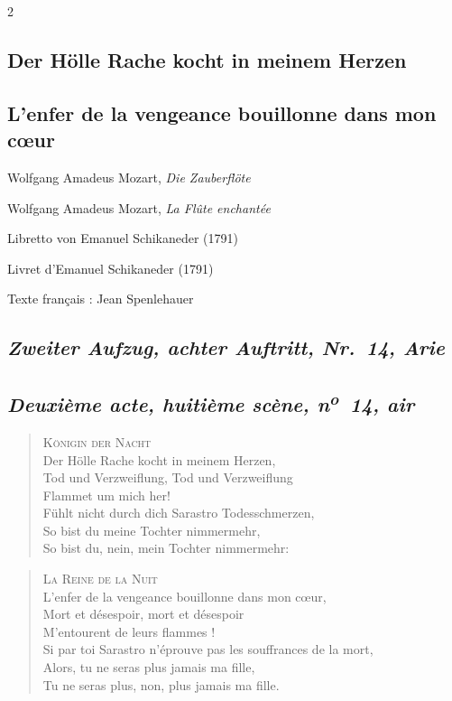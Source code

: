 \documentclass[a4paper,12pt]{article}
\newcommand\chunks[2]{%
\begin{leftcolumn*}\begin{otherlanguage}{german}%
{#1}%
\end{otherlanguage}\end{leftcolumn*}%
\begin{rightcolumn}\begin{otherlanguage}{french}%
{#2}%
\end{otherlanguage}\end{rightcolumn}%
}
\newcommand\strophe[1]{\subsection*{\normalsize\normalfont\itshape #1}}
\begin{document}
\thispagestyle{empty}
\setlength{\columnsep}{8mm}


\begin{paracol}{2}

  \chunks{\section*{Der Hölle Rache kocht in meinem Herzen}}
         {\section*{L’enfer de la vengeance bouillonne dans mon cœur}}

  \chunks{\noindent\raggedright\small Wolfgang Amadeus Mozart, \textit{Die Zauberflöte}}
         {\noindent\raggedright\small Wolfgang Amadeus Mozart, \textit{La Flûte enchantée}}

  \chunks{\noindent\raggedright\small Libretto von Emanuel Schikaneder (1791)}
         {\noindent\raggedright\small Livret d’Emanuel Schikaneder (1791)}

  \chunks{}
         {\noindent\raggedright\small Texte français : Jean Spenlehauer}

  \chunks{\strophe{Zweiter Aufzug, achter Auftritt, Nr.~14, Arie}}
         {\strophe{Deuxième acte, huitième scène, n\textsuperscript{o}~14, air}}

  \chunks{\begin{verse}
          \textsc{Königin der Nacht}\\[\medskipamount]
          Der Hölle Rache kocht in meinem Herzen,\\
          Tod und Verzweiflung, Tod und Verzweiflung\\
          Flammet um mich her!\\
          Fühlt nicht durch dich Sarastro Todesschmerzen,\\
          So bist du meine Tochter nimmermehr,\\
          So bist du, nein, mein Tochter nimmermehr:
          \end{verse}}
         {\begin{verse}
          \textsc{La Reine de la Nuit}\\[\medskipamount]
          L’enfer de la vengeance bouillonne dans mon cœur,\\
          Mort et désespoir, mort et désespoir\\
          M’entourent de leurs flammes !\\
          Si par toi Sarastro n’éprouve pas les souffrances de la mort,\\
          Alors, tu ne seras plus jamais ma fille,\\
          Tu ne seras plus, non, plus jamais ma fille.
          \end{verse}}


\end{paracol}
\end{document}
